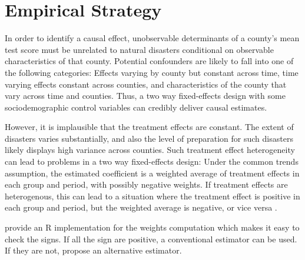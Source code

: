 
\section{Empirical Strategy}



In order to identify a causal effect, unobservable determinants of a county's mean test score must be unrelated to natural disasters conditional on observable characteristics of that county. Potential confounders are likely to fall into one of the following categories: Effects varying by county but constant across time, time varying effects constant across counties, and characteristics of the county that vary across time and counties. Thus, a two way fixed-effects design with some sociodemographic control variables can credibly deliver causal estimates.

However, it is implausible that the treatment effects are constant. The extent of disasters varies substantially, and also the level of preparation for such disasters likely displays high variance across counties. Such treatment effect heterogeneity can lead to problems in a two way fixed-effects design: Under the common trends assumption, the estimated coefficient is a weighted average of treatment effects in each group and period, with possibly negative weights. If treatment effects are heterogenous, this can lead to a situation where the treatment effect is positive in each group and period, but the weighted average is negative, or vice versa \citep{deChaisemartin_2020}.

\cite{TwoWayFEWeights} provide an R implementation for the weights computation which makes it easy to check the signs. If all the sign are positive, a conventional estimator can be used. If they are not, \cite{deChaisemartin_2020} propose an alternative estimator.


